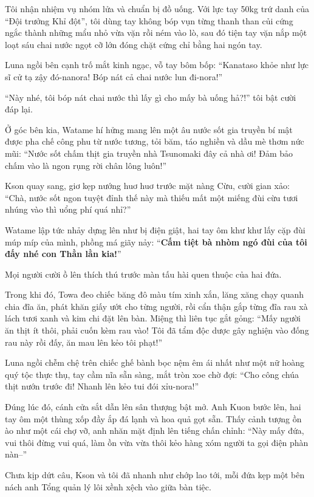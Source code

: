 \documentclass[../main.tex]{subfiles}
\begin{document}
Tôi nhận nhiệm vụ nhóm lửa và chuẩn bị đồ uống. Với lực tay 50kg trứ danh của ``Đội trưởng Khỉ đột'', tôi dùng tay không bóp vụn từng thanh than củi cứng ngắc thành những mẩu nhỏ vừa vặn rồi ném vào lò, sau đó tiện tay vặn nắp một loạt sáu chai nước ngọt cỡ lớn đóng chặt cứng chỉ bằng hai ngón tay.

Luna ngồi bên cạnh trố mắt kinh ngạc, vỗ tay bôm bốp: ``Kanataso khỏe như lực sĩ cử tạ zậy đó-nanora! Bóp nát cả chai nước lun đi-nora!''

``Này nhé, tôi bóp nát chai nước thì lấy gì cho mấy bà uống hả?!'' tôi bật cười đáp lại.

Ở góc bên kia, Watame hí hửng mang lên một âu nước sốt gia truyền bí mật được pha chế công phu từ nước tương, tỏi băm, táo nghiền và dầu mè thơm nức mũi: ``Nước sốt chấm thịt gia truyền nhà Tsunomaki đây cả nhà ơi! Đảm bảo chấm vào là ngon rụng rời chân lông luôn!''

Kson quay sang, giơ kẹp nướng huơ huơ trước mặt nàng Cừu, cười gian xảo: ``Chà, nước sốt ngon tuyệt đỉnh thế này mà thiếu mất một miếng đùi cừu tươi nhúng vào thì uổng phí quá nhỉ?''

Watame lập tức nhảy dựng lên như bị điện giật, hai tay ôm khư khư lấy cặp đùi múp míp của mình, phồng má giãy nảy: ``\textbf{Cấm tiệt bà nhòm ngó đùi của tôi đấy nhé con Thằn lằn kia!}''

Mọi người cười ồ lên thích thú trước màn tấu hài quen thuộc của hai đứa.

Trong khi đó, Towa đeo chiếc băng đô màu tím xinh xắn, lăng xăng chạy quanh chia đĩa ăn, phát khăn giấy ướt cho từng người, rồi cẩn thận gắp từng đĩa rau xà lách tươi xanh và kim chi đặt lên bàn. Miệng thì liên tục gắt gỏng: ``Mấy người ăn thịt ít thôi, phải cuốn kèm rau vào! Tôi đã tẩm độc dược gây nghiện vào đống rau này rồi đấy, ăn mau lên kẻo tôi phạt!''

Luna ngồi chễm chệ trên chiếc ghế bành bọc nệm êm ái nhất như một nữ hoàng quý tộc thực thụ, tay cầm nĩa sẵn sàng, mắt tròn xoe chờ đợi: ``Cho công chúa thịt nướn trước đi! Nhanh lên kẻo tui đói xỉu-nora!''

Đúng lúc đó, cánh cửa sắt dẫn lên sân thượng bật mở. Anh Kuon bước lên, hai tay ôm một thùng xốp đầy ắp đá lạnh và hoa quả gọt sẵn. Thấy cảnh tượng ồn ào như một cái chợ vỡ, anh nhăn mặt định lên tiếng chấn chỉnh: ``Này mấy đứa, vui thôi đừng vui quá, làm ồn vừa vừa thôi kẻo hàng xóm người ta gọi điện phàn nàn--''

Chưa kịp dứt câu, Kson và tôi đã nhanh như chớp lao tới, mỗi đứa kẹp một bên nách anh Tổng quản lý lôi xềnh xệch vào giữa bàn tiệc.
\end{document}
